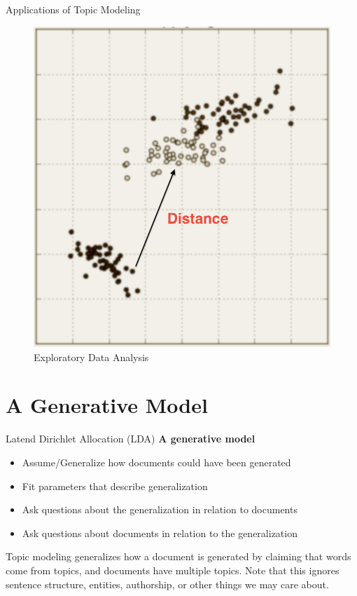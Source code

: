 \documentclass[10pt]{beamer}
\begin{document}
\begin{frame}{Applications of Topic Modeling}
\begin{multicols}{3}
  \hfill
    \begin{figure}
  \includegraphics[width=\columnwidth]{dist.png}
  \caption{Exploratory Data Analysis}
  \end{figure}

  \end{multicols}

\end{frame}

\section{A Generative Model}

\begin{frame}{Latend Dirichlet Allocation (LDA)}
  {\bf A generative model}

  \begin{itemize}
  \item Assume/Generalize how documents could have been generated
  \item Fit parameters that describe generalization
  \item Ask questions about the generalization in relation to documents
  \item Ask questions about documents in relation to the generalization
  \end{itemize}

  \vspace{1em}

  Topic modeling generalizes how a document is generated by claiming that words come from topics, and documents have multiple topics. Note that this ignores sentence structure, entities, authorship, or other things we may care about.
\end{frame}
\end{document}
